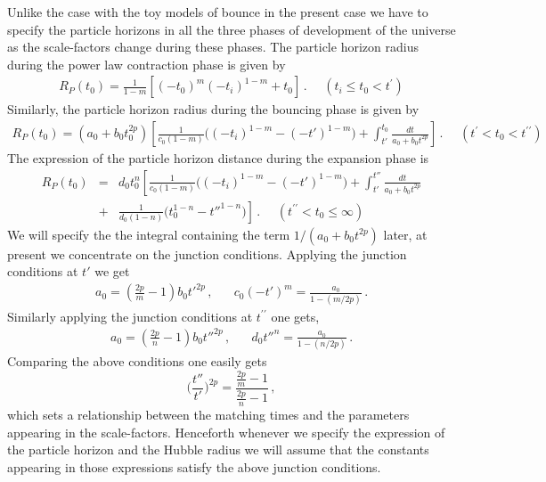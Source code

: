 \documentclass[24pt]{article}
\begin{document}
Unlike the case with the toy models of bounce in the present case we
have to specify the particle horizons in all the three phases
of development of the universe as the scale-factors change during
these phases. The particle horizon radius during the power law
contraction phase is given by
\begin{eqnarray}
  R_P(t_0) = \frac{1}{1-m}[(-t_0)^m (-t_i)^{1-m}+t_0]\,.\,\,\,\,\,\,\,\,
  (t_i \le t_0 < t^\prime)
\label{rpi}
\end{eqnarray}
Similarly, the particle horizon radius during the bouncing phase is given by
\begin{eqnarray}
R_P(t_0) = (a_0 +  b_0t_0^{2p})\left[\frac{1}{c_0(1-m)}\Big((-t_i)^{1-m}-(-t')^{1-m}
    \Big) +\int ^{t_0} _{t'} \frac{dt}{a_0 +  b_0t^{2p}}
  \right]\,.\,\,\,\,\,\,\,\, (t^{\prime } < t_0 < t^{\prime \prime})
\label{rpm}
\end{eqnarray}
The expression of the particle horizon distance during the expansion
phase is
\begin{eqnarray}
R_P(t_0)&=&d_0 t_0^n \left[\frac{1}{c_0(1-m)}\Big((-t_i)^{1-m}-(-t')^{1-m} \Big)
  +\int ^{t''} _{t'} \frac{dt}{a_0 +  b_0t^{2p}}\right.\nonumber\\
&+&\left.\frac{1}{d_0(1-n)}\Big(t_0^{1-n}-t''^{1-n}\Big)\right] \,.
\,\,\,\,\,\,\,\,(t^{\prime \prime} < t_0 \le \infty)
\label{rpf}
\end{eqnarray}
We will specify the the integral containing the term $1/(a_0 + b_0
t^{2p})$ later, at present we concentrate on the junction
conditions. Applying the junction conditions at $t'$ we get
\begin{eqnarray}
  a_0=\left(\frac{2p}{m}-1\right)b_0 t'^{2p}\,,\,\,\,\,\,\,\,\,\,\,
  c_0 (-t')^m=\frac{a_0}{1-(m/2p)}\,.
\label{jptp}
\end{eqnarray}
Similarly applying the junction conditions at $t^{\prime\prime}$ one gets,
\begin{eqnarray}
a_0= \left(\frac{2p}{n}-1\right)b_0 t''^{2p}\,,\,\,\,\,\,\,\,\,\,\,
d_0 t''^n=\frac{a_0}{1-(n/2p)}\,.
\label{jctpp}
\end{eqnarray}
Comparing the above conditions one easily gets
\begin{equation}
\Big (\frac{t''}{t'}\Big)^{2p}  = \frac{\frac{2p}{m}-1}{\frac{2p}{n}-1}\,,
\label{tptpp}
\end{equation}
which sets a relationship between the matching times and the parameters
appearing in the scale-factors. Henceforth whenever we specify the
expression of the particle horizon and the Hubble radius we will
assume that the constants appearing in those expressions satisfy the
above junction conditions. 
\end{document}
